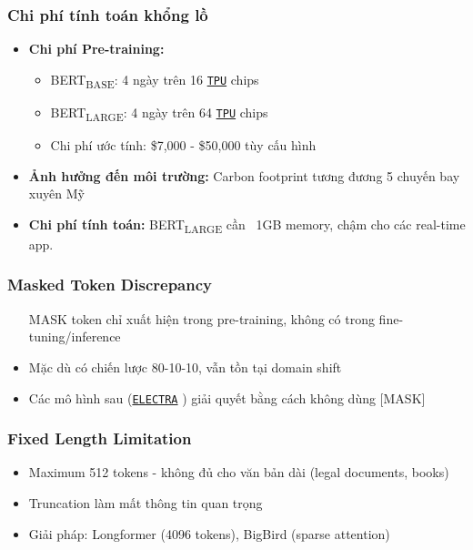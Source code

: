 \subsubsection{Chi phí tính toán khổng lồ}
\begin{itemize}
    \item \textbf{Chi phí Pre-training:}
    \begin{itemize}
        \item BERT\textsubscript{BASE}: 4 ngày trên 16 \hyperref[acro:tpu]{\texttt{TPU}} chips \cite{devlin2018bert}
        \item BERT\textsubscript{LARGE}: 4 ngày trên 64 \hyperref[acro:tpu]{\texttt{TPU}} chips \cite{devlin2018bert}
        \item Chi phí ước tính: \$7,000 - \$50,000 tùy cấu hình
    \end{itemize}
    \item \textbf{Ảnh hưởng đến môi trường:} Carbon footprint tương đương 5 chuyến bay xuyên Mỹ
    \item \textbf{Chi phí tính toán:} BERT\textsubscript{LARGE} cần ~1GB memory, chậm cho các real-time app.
\end{itemize}

\subsubsection{Masked Token Discrepancy}
\begin{itemize}
    \item [MASK] token chỉ xuất hiện trong pre-training, không có trong fine-tuning/inference
    \item Mặc dù có chiến lược 80-10-10, vẫn tồn tại domain shift
    \item Các mô hình sau (\hyperref[acro:electra]{\texttt{ELECTRA}} \cite{clark2020electra}) giải quyết bằng cách không dùng [MASK]
\end{itemize}

\subsubsection{Fixed Length Limitation}
\begin{itemize}
    \item Maximum 512 tokens - không đủ cho văn bản dài (legal documents, books)
    \item Truncation làm mất thông tin quan trọng
    \item Giải pháp: Longformer \cite{beltagy2020longformer} (4096 tokens), BigBird (sparse attention)
\end{itemize}

